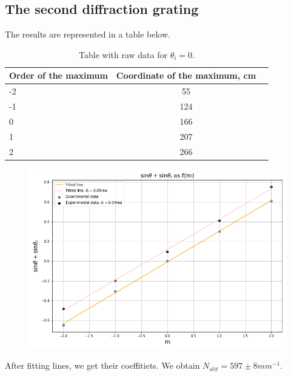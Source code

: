 \documentclass[a4paper, 12pt]{article}
\begin{document}
	\subsection*{The second diffraction grating}
	The results are represented in a table below.
	\begin{table}[H]
		\centering
		\caption{Table with raw data for $\theta_{i} = 0$.}
		\begin{tabular}[t]{lcc}
			\hline
			Order of the maximum&Coordinate of the maximum, cm\\
			\hline
			-2&55\\
			-1&124\\
			0&166\\
			1&207\\
			2&266\\
			\hline
		\end{tabular}
	\end{table}
	\begin{figure}[H]
		\centering
		\includegraphics[width=0.75\linewidth]{600.png}
		\caption{}
		\label{fig:600}
	\end{figure}
	After fitting lines, we get their coeffitiets. We obtain $N_{slit} = 597 \pm 8 mm^{-1}$.
\end{document}
